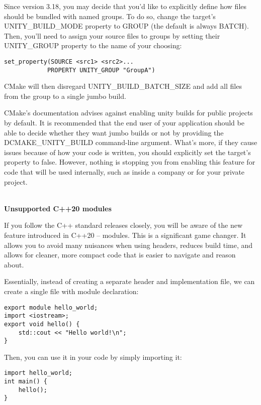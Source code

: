 Since version 3.18, you may decide that you'd like to explicitly define how files should be bundled with named groups. To do so, change the target's UNITY\_BUILD\_MODE property to GROUP (the default is always BATCH). Then, you'll need to assign your source files to groups by setting their UNITY\_GROUP property to the name of your choosing:

\begin{lstlisting}[style=styleCMake]
set_property(SOURCE <src1> <src2>...
			PROPERTY UNITY_GROUP "GroupA")
\end{lstlisting}

CMake will then disregard UNITY\_BUILD\_BATCH\_SIZE and add all files from the group to a single jumbo build.

CMake's documentation advises against enabling unity builds for public projects by default. It is recommended that the end user of your application should be able to decide whether they want jumbo builds or not by providing the DCMAKE\_UNITY\_BUILD command-line argument. What's more, if they cause issues because of how your code is written, you should explicitly set the target's property to false. However, nothing is stopping you from enabling this feature for code that will be used internally, such as inside a company or for your private project.

\hspace*{\fill} \\ %
\noindent
\textbf{Unsupported C++20 modules}

If you follow the C++ standard releases closely, you will be aware of the new feature introduced in C++20 – modules. This is a significant game changer. It allows you to avoid many nuisances when using headers, reduces build time, and allows for cleaner, more compact code that is easier to navigate and reason about.

Essentially, instead of creating a separate header and implementation file, we can create a single file with module declaration:

\begin{lstlisting}[style=styleCXX]
export module hello_world;
import <iostream>;
export void hello() {
	std::cout << "Hello world!\n";
}
\end{lstlisting}

Then, you can use it in your code by simply importing it:

\begin{lstlisting}[style=styleCXX]
import hello_world;
int main() {
	hello();
}
\end{lstlisting}

